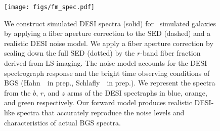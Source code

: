 \begin{figure}
\begin{center}
\texttt{[image: figs/fm\_spec.pdf]}
\caption{
    We construct simulated DESI spectra (solid) for \lgal~simulated galaxies by
    applying a fiber aperture correction to the SED (dashed) and a realistic
    DESI noise model. 
    We apply a fiber aperture correction by scaling down the full SED (dotted)
    by the $r$-band fiber fraction derived from LS imaging. 
    The noise model accounts for the DESI spectrograph response and the bright
    time observing conditions of BGS (Hahn~\etal~in prep., Schlafly~\etal~in
    prep.).  
    We represent the spectra from the $b$, $r$, and $z$ arms of the DESI
    spectraphs in blue, orange, and green respectively. 
    Our forward model produces realistic DESI-like spectra that accurately
    reproduce the noise levels and characteristics of actual BGS spectra. 
    } \label{fig:spec}
\end{center}
\end{figure}

